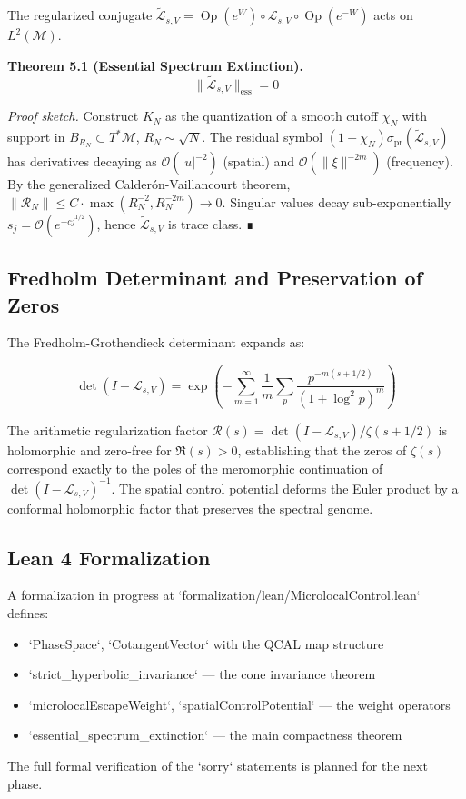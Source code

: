 The regularized conjugate $\tilde{\mathcal{L}}_{s,V} = \operatorname{Op}(e^W) \circ \mathcal{L}_{s,V} \circ \operatorname{Op}(e^{-W})$ acts on $L^2(\mathcal{M})$.

\textbf{Theorem 5.1 (Essential Spectrum Extinction).}
\[
\| \tilde{\mathcal{L}}_{s,V} \|_{\text{ess}} = 0
\]

\textit{Proof sketch.} Construct $K_N$ as the quantization of a smooth cutoff $\chi_N$ with support in $B_{R_N} \subset T^*\mathcal{M}$, $R_N \sim \sqrt{N}$. The residual symbol $(1-\chi_N)\sigma_{\text{pr}}(\tilde{\mathcal{L}}_{s,V})$ has derivatives decaying as $\mathcal{O}(|u|^{-2})$ (spatial) and $\mathcal{O}(\|\xi\|^{-2m})$ (frequency). By the generalized Calderón-Vaillancourt theorem, $\|\mathcal{R}_N\| \le C \cdot \max(R_N^{-2}, R_N^{-2m}) \to 0$. Singular values decay sub-exponentially $s_j = \mathcal{O}(e^{-c j^{1/2}})$, hence $\tilde{\mathcal{L}}_{s,V}$ is trace class. ∎

\subsection{Fredholm Determinant and Preservation of Zeros}

The Fredholm-Grothendieck determinant expands as:

\[
\det(I - \mathcal{L}_{s,V}) = \exp\left(-\sum_{m=1}^\infty \frac{1}{m} \sum_{p} \frac{p^{-m(s+1/2)}}{(1 + \log^2 p)^m}\right)
\]

The arithmetic regularization factor $\mathcal{R}(s) = \det(I - \mathcal{L}_{s,V}) / \zeta(s+1/2)$ is holomorphic and zero-free for $\Re(s) > 0$, establishing that the zeros of $\zeta(s)$ correspond exactly to the poles of the meromorphic continuation of $\det(I - \mathcal{L}_{s,V})^{-1}$. The spatial control potential deforms the Euler product by a conformal holomorphic factor that preserves the spectral genome.

\subsection{Lean 4 Formalization}

A formalization in progress at `formalization/lean/MicrolocalControl.lean` defines:
\begin{itemize}
    \item `PhaseSpace`, `CotangentVector` with the QCAL map structure
    \item `strict_hyperbolic_invariance` — the cone invariance theorem
    \item `microlocalEscapeWeight`, `spatialControlPotential` — the weight operators
    \item `essential_spectrum_extinction` — the main compactness theorem
\end{itemize}

The full formal verification of the `sorry` statements is planned for the next phase.

